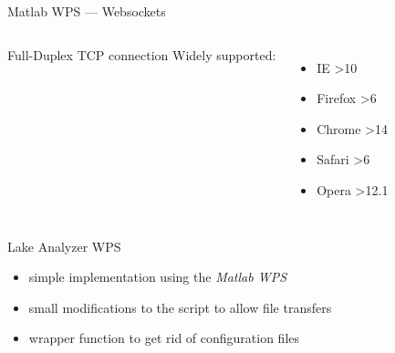 \documentclass[xcolor=svgnames,professionalfonts,11pt,aspectratio=43]{beamer}
\begin{document}

\begin{frame}[c,fragile]{Matlab WPS --- Websockets}
  \begin{columns}
    
    \pause
    
  \end{columns}
  \pause
  \begin{columns}
  Full-Duplex TCP connection
  \pause
  Widely supported:
  \begin{itemize}
    \item IE \textgreater10
    \item Firefox \textgreater6
    \item Chrome \textgreater14
    \item Safari \textgreater6
    \item Opera \textgreater12.1
  \end{itemize}
  \end{columns}
\end{frame}


\begin{frame}[t]{Lake Analyzer WPS}
  \begin{itemize}
    \item simple implementation using the \emph{Matlab WPS}
    \item small modifications to the script to allow file transfers
    \item wrapper function to get rid of configuration files
  \end{itemize}
\end{frame}
\end{document}
